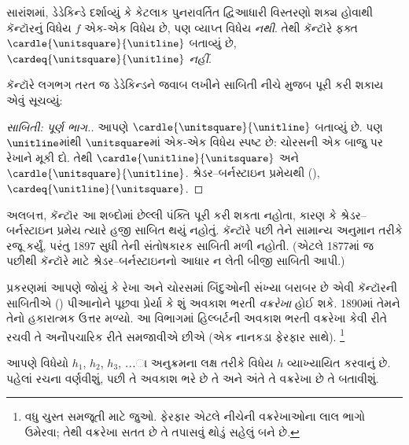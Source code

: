 સારાંશમાં, ડેડેકિન્ડે દર્શાવ્યું
કે કેટલાક પુનરાવર્તિત
દ્વિઆધારી વિસ્તરણો શક્ય હોવાથી
કૅન્ટૉરનું વિધેય $f$
એક-એક વિધેય છે, પણ
વ્યાપ્ત વિધેય \emph{નથી}.
તેથી કૅન્ટૉરે ફક્ત
$\cardle{\unitsquare}{\unitline}$
બતાવ્યું છે,
$\cardeq{\unitsquare}{\unitline}$
\emph{નહીં}.

કૅન્ટૉરે લગભગ તરત જ
ડેડેકિન્ડને જવાબ લખીને
સાબિતી નીચે મુજબ
પૂરી કરી શકાય એવું સૂચવ્યું:

\begin{proof}[સાબિતી: પૂર્ણ ભાગ.]
આપણે $\cardle{\unitsquare}{\unitline}$
બતાવ્યું છે. પણ $\unitline$માંથી
$\unitsquare$માં એક-એક વિધેય
સ્પષ્ટ છે: ચોરસની એક બાજુ
પર રેખાને મૂકી દો. તેથી
$\cardle{\unitline}{\unitsquare}$ અને
$\cardle{\unitsquare}{\unitline}$. શ્રેડર--બર્નસ્ટાઇન પ્રમેયથી
(),
$\cardeq{\unitline}{\unitsquare}$.
\end{proof}

અલબત્ત, કૅન્ટૉર આ શબ્દોમાં
છેલ્લી પંક્તિ પૂરી કરી શકતા
નહોતા, કારણ કે શ્રેડર--બર્નસ્ટાઇન
પ્રમેય ત્યારે હજી સાબિત થયું
નહોતું. કૅન્ટૉરે પછી તેને
સામાન્ય અનુમાન તરીકે રજૂ કર્યું,
પરંતુ 1897 સુધી તેની
સંતોષકારક સાબિતી મળી નહોતી.
(એટલે 1877માં જ પછીથી
કૅન્ટૉરે 
માટે શ્રેડર--બર્નસ્ટાઇનનો
આધાર ન લેતી બીજી
સાબિતી આપી.)
\endgroup

\begingroup
\makeatletter{}\makeatother


\label{guunit:OLP-0639}


 પ્રકરણમાં
આપણે જોયું કે રેખા અને
ચોરસમાં બિંદુઓની સંખ્યા
બરાબર છે એવી કૅન્ટૉરની
સાબિતીએ
()
પીઆનોને પૂછવા પ્રેર્યા કે
શું અવકાશ ભરતી
\emph{વક્રરેખા} હોઈ શકે.
1890માં તેમને તેનો
હકારાત્મક ઉત્તર મળ્યો.
આ વિભાગમાં હિલ્બર્ટની
અવકાશ ભરતી વક્રરેખા
કેવી રીતે રચવી તે
અનૌપચારિક રીતે
સમજાવીએ છીએ
(એક નાનકડા ફેરફાર સાથે).
\footnote{વધુ ચુસ્ત સમજૂતી
માટે \cite{Rose2010} જુઓ.
ફેરફાર એટલે નીચેની
વક્રરેખાઓના લાલ
ભાગો ઉમેરવા; તેથી
વક્રરેખા સતત છે તે
તપાસવું થોડું સહેલું બને છે.}

આપણે વિધેયો $h_1$, $h_2$, $h_3$,
\dots{}ા અનુક્રમના
લક્ષ તરીકે વિધેય $h$
વ્યાખ્યાયિત કરવાનું છે.
પહેલાં રચના વર્ણવીશું,
પછી તે અવકાશ ભરે છે
તે અને અંતે તે
વક્રરેખા છે તે બતાવીશું.

